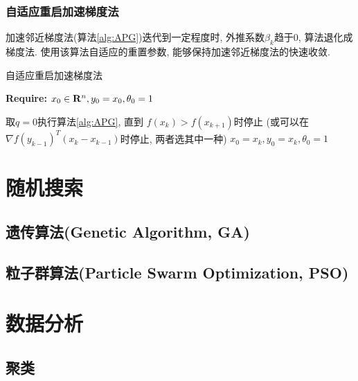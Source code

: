 \documentclass[a4paper,11pt,oneside]{book}
\begin{document}
\subsection{自适应重启加速梯度法}

加速邻近梯度法(算法\ref{alg:APG})迭代到一定程度时, 外推系数$\beta_k$趋于0, 算法退化成梯度法. 使用该算法自适应的重置参数, 能够保持加速邻近梯度法的快速收敛.

\begin{algorithm}
\caption{自适应重启加速梯度法\cite{o2015adaptive}}
{\bf Require:} $x_0\in {\bf R}^n, y_0=x_0, \theta_0=1$
\begin{algorithmic}[1]
	\State 取$q=0$执行算法\ref{alg:APG}, 直到 $f(x_k)>f(x_{k+1})$时停止 (或可以在 $\nabla f(y_{k-1})^T(x_k-x_{k-1})$时停止, 两者选其中一种)
	\State $x_0=x_k, y_0=x_k, \theta_0=1$
\EndFor
\end{algorithmic}
\end{algorithm}

\chapter{随机搜索}
\section{遗传算法(Genetic Algorithm, GA)}
\section{粒子群算法(Particle Swarm Optimization, PSO)}

\chapter{数据分析}
\section{聚类}

\backmatter


\end{document}
